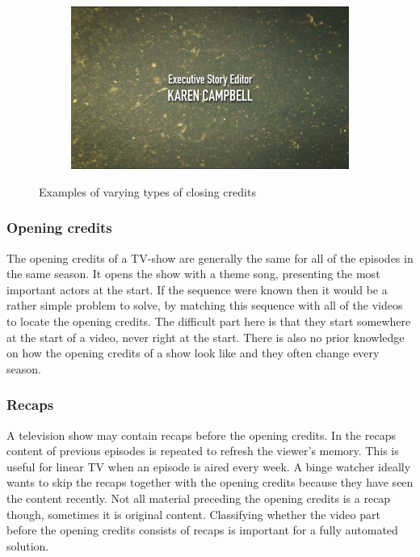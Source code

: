 \documentclass{article}
\begin{document}
\begin{figure}[H]
\begin{subfigure}[b]{0.4\textwidth}
\end{subfigure}
\begin{subfigure}[b]{0.4\textwidth}
	\includegraphics[width=\textwidth]{images/diffcredits2.png}
\end{subfigure}
  \caption{Examples of varying types of closing credits}
  \label{closingcredits}
\end{figure}

\subsubsection{Opening credits}
The opening credits of a TV-show are generally the same for all of the episodes in the same season. It opens the show with a theme song, presenting the most important actors at the start. If the sequence were known then it would be a rather simple problem to solve, by matching this sequence with all of the videos to locate the opening credits. The difficult part here is that they start somewhere at the start of a video, never right at the start. There is also no prior knowledge on how the opening credits of a show look like and they often change every season.

\subsubsection{Recaps}
A television show may contain recaps before the opening credits. In the recaps content of previous episodes is repeated to refresh the viewer's memory. This is useful for linear TV when an episode is aired every week. A binge watcher ideally wants to skip the recaps together with the opening credits because they have seen the content recently. Not all material preceding the opening credits is a recap though, sometimes it is original content. Classifying whether the video part before the opening credits consists of recaps is important for a fully automated solution.
\end{document}
